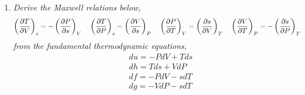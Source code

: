 \begin{enumerate}
\item {\it Derive the Maxwell relations below,
\begin{displaymath}
%
 \left(\frac{\partial T}{\partial V}\right)_{s} = -\left(\frc{\partial P}{\partial s}\right)_{V} \;\;\;\;
%
 \left(\frc{\partial T}{\partial P}\right)_{s} = \left(\frac{\partial V}{\partial s}\right)_{P} \;\;\;\;
%
 \left(\frc{\partial P}{\partial T}\right)_{V} = \left(\frac{\partial s}{\partial V}\right)_{T} \;\;\;\;
%
  \left(\frac{\partial V}{\partial T}\right)_{P} = -\left(\frc{\partial s}{\partial P}\right)_{T} \;\;\;\; 
\end{displaymath}
from the fundamental thermodynamic equations,
\begin{eqnarray}
&& du = - PdV + Tds \nonumber \\ 
&& dh =   Tds + VdP \nonumber \\
&& df = - PdV - sdT \nonumber \\
&& dg = - VdP - sdT \nonumber
\end{eqnarray}}

\end{enumerate}
